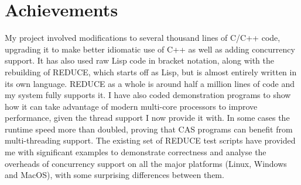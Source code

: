 \section{Achievements}
\label{sec:achievements}

My project involved modifications to several thousand lines of C/C++ code, upgrading it to
make better idiomatic use of C++ as well as adding concurrency support. It has also used raw
Lisp code in bracket notation, along with the rebuilding of REDUCE, which starts off as Lisp,
but is almost entirely written in its own language. REDUCE as a whole is around half a million
lines of code and my system fully supports it. I have also coded demonstration programs to
show how it can take advantage of modern multi-core processors to improve performance,
given the thread support I now provide it with. In some cases the runtime speed more than doubled,
proving that CAS programs can benefit from multi-threading support.
The existing set of REDUCE test scripts have provided me
with significant examples to demonstrate correctness and analyse the overheads of
concurrency support on all the major platforms (Linux, Windows and MacOS), with some surprising
differences between them.